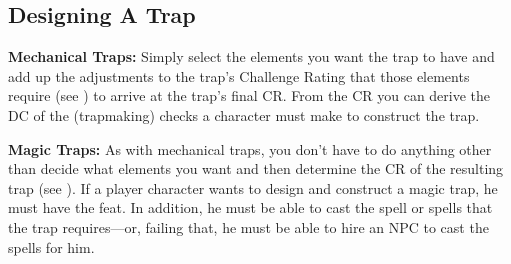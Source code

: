 \subsection{Designing A Trap}
\textbf{Mechanical Traps:} Simply select the elements you want the trap to have and add up the adjustments to the trap's Challenge Rating that those elements require (see ) to arrive at the trap's final CR. From the CR you can derive the DC of the  (trapmaking) checks a character must make to construct the trap.


\textbf{Magic Traps:} As with mechanical traps, you don't have to do anything other than decide what elements you want and then determine the CR of the resulting trap (see ). If a player character wants to design and construct a magic trap, he must have the  feat. In addition, he must be able to cast the spell or spells that the trap requires---or, failing that, he must be able to hire an NPC to cast the spells for him.

